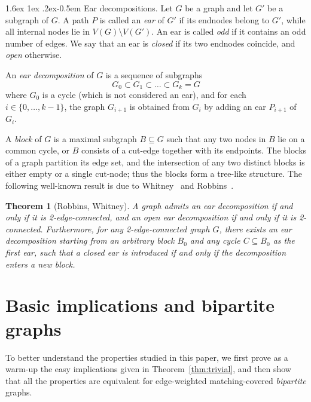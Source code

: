 \documentclass{article}
\makeatletter
\renewcommand{\paragraph}{%
  \@startsection{paragraph}{4}%
  {\z@}{1.6ex \@plus 1ex \@minus .2ex}{-0.5em}%
  {\normalfont\normalsize\bfseries}%
}
\theoremstyle{plain}
\newtheorem{thm}{Theorem}[section]
\theoremstyle{definition}
\makeatother
\begin{document}
\paragraph{Ear decompositions.} Let $G$ be a graph and let $G'$ be a subgraph of $G$. A path $P$ is called an \emph{ear} of $G'$ if its endnodes belong to $G'$, while all internal nodes lie in $V(G)\setminus V(G')$. An ear is called \emph{odd} if it contains an odd number of edges. We say that an ear is \emph{closed} if its two endnodes coincide, and \emph{open} otherwise. 

An \emph{ear decomposition} of $G$ is a sequence of subgraphs
\[
G_{0} \subset G_{1} \subset \dots \subset G_{k} = G
\]
where $G_0$ is a cycle (which is not considered an ear), and for each $i \in \{0, \dots, k-1\}$, the graph $G_{i+1}$ is obtained from $G_i$ by adding an ear $P_{i+1}$ of $G_i$. 

A \emph{block} of $G$ is a maximal subgraph $B\subseteq G$ such that any two nodes in $B$ lie on a common cycle, or $B$ consists of a cut-edge together with its endpoints. The blocks of a graph partition its edge set, and the intersection of any two distinct blocks is either empty or a single cut-node; thus the blocks form a tree-like structure. The following well-known result is due to Whitney~\cite{whitney1931non} and Robbins~\cite{robbins1939theorem}.

\begin{thm}[Robbins, Whitney]\label{thm:whitney}
   A graph admits an ear decomposition if and only if it is 2-edge-connected, and an open ear decomposition if and only if it is 2-connected. Furthermore, for any 2-edge-connected graph $G$, there exists an ear decomposition starting from an arbitrary block $B_0$ and any cycle $C\subseteq B_0$ as the first ear, such that a closed ear is introduced if and only if the decomposition enters a new block.
\end{thm}

\section{Basic implications and bipartite graphs}
\label{sec:bipartite}

To better understand the properties studied in this paper, we first prove as a warm-up the easy implications given in Theorem~\ref{thm:trivial}, and then show that all the properties are equivalent for edge-weighted matching-covered \emph{bipartite} graphs.
\end{document}
